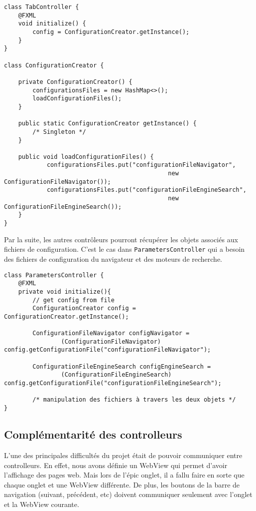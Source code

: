 \documentclass[10pt,a4paper]{article}
\begin{document}
\newpage

\begin{lstlisting}
class TabController {
    @FXML
    void initialize() {
	    config = ConfigurationCreator.getInstance();
    }
}

class ConfigurationCreator {
	
	private ConfigurationCreator() {
		configurationsFiles = new HashMap<>();
		loadConfigurationFiles();
	}
	
	public static ConfigurationCreator getInstance() {
	    /* Singleton */
	}

    public void loadConfigurationFiles() {
	    	configurationsFiles.put("configurationFileNavigator", 
		                                      new ConfigurationFileNavigator());
		    configurationsFiles.put("configurationFileEngineSearch", 
		                                      new ConfigurationFileEngineSearch());
	}
}
\end{lstlisting}

Par la suite, les autres contrôleurs pourront récupérer les objets associés aux fichiers de configuration. C'est le cas dans \verb|ParametersController| qui a besoin des fichiers de configuration du navigateur et des moteurs de recherche.

\begin{lstlisting}
class ParametersController {
    @FXML
    private void initialize(){
        // get config from file
        ConfigurationCreator config = ConfigurationCreator.getInstance();

        ConfigurationFileNavigator configNavigator = 
        		(ConfigurationFileNavigator) config.getConfigurationFile("configurationFileNavigator");
        
        ConfigurationFileEngineSearch configEngineSearch =
        		(ConfigurationFileEngineSearch) config.getConfigurationFile("configurationFileEngineSearch");
        		
        /* manipulation des fichiers à travers les deux objets */
}
\end{lstlisting}  

\newpage

\subsection{Complémentarité des controlleurs}
L'une des principales difficultés du projet était de pouvoir communiquer entre controlleurs. En effet, nous avons définie un WebView qui permet d'avoir l'affichage des pages web. Mais lors de l'épic onglet, il a fallu faire en sorte que chaque onglet et une WebView différente. De plus, les boutons de la barre de navigation (suivant, précédent, etc) doivent communiquer seulement avec l'onglet et la WebView courante. \\
\end{document}
